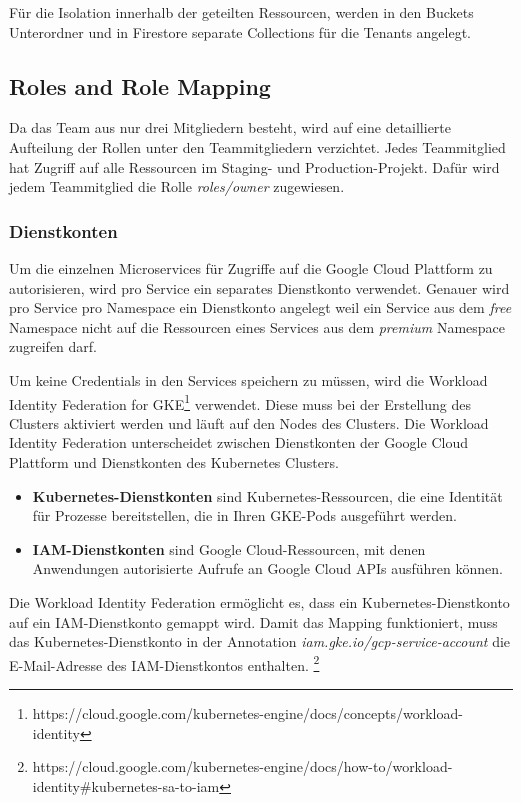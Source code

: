 Für die Isolation innerhalb der geteilten Ressourcen, werden in den Buckets Unterordner und in
Firestore separate Collections für die Tenants angelegt.

\subsection{Roles and Role Mapping}

Da das Team aus nur drei Mitgliedern besteht, wird auf eine detaillierte Aufteilung der Rollen unter
den Teammitgliedern verzichtet. Jedes Teammitglied hat Zugriff auf alle Ressourcen im Staging- und Production-Projekt.
Dafür wird jedem Teammitglied die Rolle \textit{roles/owner} zugewiesen.

\subsubsection{Dienstkonten}

Um die einzelnen Microservices für Zugriffe auf die Google Cloud Plattform zu autorisieren, wird pro Service ein separates Dienstkonto verwendet.
Genauer wird pro Service pro Namespace ein Dienstkonto angelegt weil ein Service aus dem \textit{free}
Namespace nicht auf die Ressourcen eines Services aus dem \textit{premium} Namespace zugreifen darf.

Um keine Credentials in den Services speichern zu müssen, 
wird die \glqq{}Workload Identity Federation for GKE\grqq{}\footnote{https://cloud.google.com/kubernetes-engine/docs/concepts/workload-identity} verwendet.
Diese muss bei der Erstellung des Clusters aktiviert werden und läuft auf den Nodes des Clusters. 
Die Workload Identity Federation unterscheidet zwischen Dienstkonten 
der Google Cloud Plattform und Dienstkonten des Kubernetes Clusters.

\begin{itemize}
  \item \textbf{Kubernetes-Dienstkonten} sind Kubernetes-Ressourcen, die eine Identität für Prozesse bereitstellen, 
  die in Ihren GKE-Pods ausgeführt werden.
  \item \textbf{IAM-Dienstkonten} sind Google Cloud-Ressourcen, 
  mit denen Anwendungen autorisierte Aufrufe an Google Cloud APIs ausführen können.
\end{itemize}

Die Workload Identity Federation ermöglicht es, dass ein Kubernetes-Dienstkonto auf ein IAM-Dienstkonto gemappt wird.
Damit das Mapping funktioniert, muss das Kubernetes-Dienstkonto in der Annotation 
\textit{iam.gke.io/gcp-service-account} die E-Mail-Adresse des IAM-Dienstkontos enthalten.
\footnote{https://cloud.google.com/kubernetes-engine/docs/how-to/workload-identity\#kubernetes-sa-to-iam}


